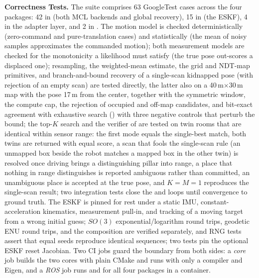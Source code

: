 \noindent\textbf{Correctness Tests.} The suite comprises 63 GoogleTest cases across the four packages: 42 in  (both MCL backends and global recovery), 15 in  (the ESKF), 4 in the  adapter layer, and 2 in . The motion model is checked deterministically (zero-command and pure-translation cases) and statistically (the mean of noisy samples approximates the commanded motion); both measurement models are checked for the monotonicity a likelihood must satisfy (the true pose out-scores a displaced one); resampling, the weighted-mean estimate, the grid and NDT-map primitives, and branch-and-bound recovery of a single-scan kidnapped pose (with rejection of an empty scan) are tested directly, the latter also on a 40\,m$\times$30\,m map with the pose 17\,m from the center, together with the symmetric window, the compute cap, the rejection of occupied and off-map candidates, and bit-exact agreement with exhaustive search () with three negative controls that perturb the bound; the top-$K$ search and the verifier of  are tested on twin rooms that are identical within sensor range: the first mode equals the single-best match, both twins are returned with equal score, a scan that fools the single-scan rule (an unmapped box beside the robot matches a mapped box in the other twin) is resolved once driving brings a distinguishing pillar into range, a place that nothing in range distinguishes is reported ambiguous rather than committed, an unambiguous place is accepted at the true pose, and $K=M=1$ reproduces the single-scan result; two integration tests close the  and  loops until convergence to ground truth. The ESKF is pinned for rest under a static IMU, constant-acceleration kinematics, measurement pull-in, and tracking of a moving target from a wrong initial guess; $SO(3)$ exponential/logarithm round trips, geodetic ENU round trips, and the  composition are verified separately, and RNG tests assert that equal seeds reproduce identical sequences; two tests pin the optional ESKF reset Jacobian. Two CI jobs guard the boundary from both sides: a \emph{core} job builds the two cores with plain CMake and runs  with only a compiler and Eigen, and a \emph{ROS} job runs  and  for all four packages in a  container.

